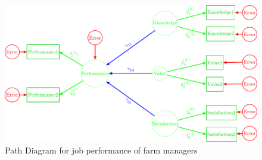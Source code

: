 \begin{figure}[H]

{\centering \includegraphics[width=0.8\linewidth]{images/Warren8V1} 

}

\caption{Path Diagram for job performance of farm managers}\label{fig:Warren8V1}
\end{figure}


